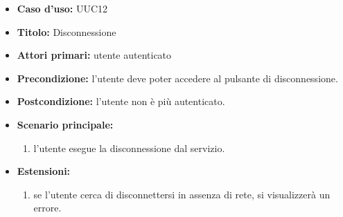 \documentclass[casi-duso]{subfiles}
\begin{document}
\begin{itemize}
  \item \textbf{Caso d’uso:} UUC12
  \item \textbf{Titolo:} Disconnessione
  \item \textbf{Attori primari:} utente autenticato
  \item \textbf{Precondizione:} l'utente deve poter accedere al pulsante di disconnessione.
  \item \textbf{Postcondizione:} l'utente non è più autenticato.
  \item \textbf{Scenario principale:}
        \begin{enumerate}
          \item l'utente esegue la disconnessione dal servizio.
        \end{enumerate}
  \item \textbf{Estensioni:}
        \begin{enumerate}
          \item se l'utente cerca di disconnettersi in assenza di rete, si visualizzerà un errore.
        \end{enumerate}
\end{itemize}
\end{document}

